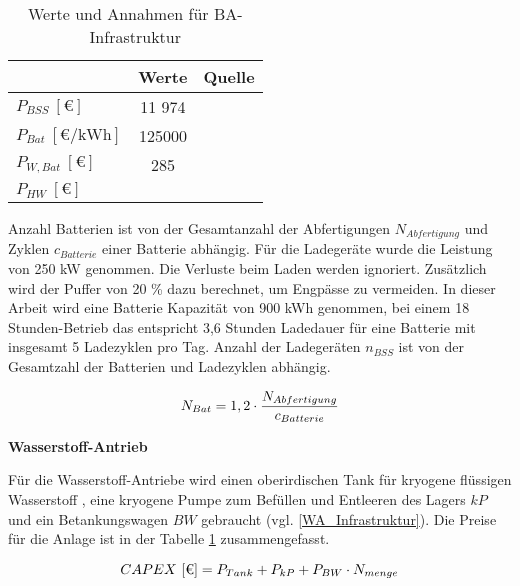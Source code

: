 \begin{table}[h]
	\begin{center}
    \caption{Werte und Annahmen für BA-Infrastruktur}
	\label{BA_Infrastrukturtab}
	\begin{tabular}{|l|c|c|}
		\hline
		 & \textbf{Werte} & \textbf{Quelle} \\ \hline
		$P_{BSS} ~[\text{€}]$ &  11 974  & \cite{guo2020aviation} \\ \hline
		$P_{Bat} ~[\text{€/kWh}]$ & 125000 & \cite{guo2020aviation} \\ \hline
		$P_{W,Bat} ~[\text{€}] $ & 285  & \cite{guo2023infrastructure}\\ \hline
      $P_{HW} ~[\text{€}] $ &  &\\ \hline
	\end{tabular}
    \end{center}
\end{table}

Anzahl Batterien ist von der Gesamtanzahl der Abfertigungen $N_{Abfertigung}$ und Zyklen $c_{Batterie}$ einer Batterie abhängig. 
Für die Ladegeräte wurde die Leistung
von 250 kW genommen. Die Verluste beim Laden werden ignoriert. Zusätzlich wird der Puffer von 20 \% dazu berechnet, um 
Engpässe zu vermeiden. In dieser Arbeit wird eine Batterie Kapazität von 900 kWh genommen, bei einem 18 Stunden-Betrieb 
das entspricht 3,6 Stunden Ladedauer für eine Batterie mit insgesamt 5 Ladezyklen pro Tag. 
Anzahl der Ladegeräten $n_{BSS}$ ist von der Gesamtzahl der Batterien und Ladezyklen abhängig.

\begin{equation}
  {N_{Bat}} = {1,2} \cdot \frac{N_{Abfertigung}}{c_{Batterie}}\\
  \label{BatAnzahl}
  \end{equation}

\textbf{Wasserstoff-Antrieb}


Für die Wasserstoff-Antriebe wird einen oberirdischen Tank für kryogene flüssigen Wasserstoff , eine kryogene Pumpe 
zum Befüllen und Entleeren des Lagers ${kP}$ und ein Betankungswagen ${BW}$ gebraucht (vgl. \eqref{WA_Infrastruktur}). 
Die Preise für die Anlage ist in der Tabelle \ref{BA_Infrastrukturtab} zusammengefasst.

\begin{equation}
   {CAPEX ~[\text{€}]} = {P_{Tank}} + P_{kP} + P_{BW} \cdot N_{menge}  \\
   \label{WA_Infrastruktur}
\end{equation}

